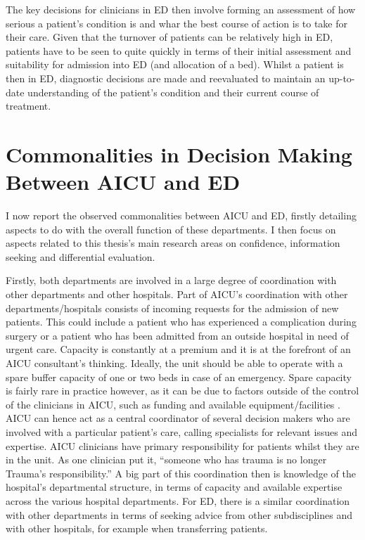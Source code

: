 \documentclass[a4paper, nobind]{templates/ociamthesis}
\begin{document}
\hfill\break
The key decisions for clinicians in ED then involve forming an assessment of how serious a patient's condition is and whar the best course of action is to take for their care. Given that the turnover of patients can be relatively high in ED, patients have to be seen to quite quickly in terms of their initial assessment and suitability for admission into ED (and allocation of a bed). Whilst a patient is then in ED, diagnostic decisions are made and reevaluated to maintain an up-to-date understanding of the patient's condition and their current course of treatment.

\section{Commonalities in Decision Making Between AICU and ED}\label{commonalities-in-decision-making-between-aicu-and-ed}

I now report the observed commonalities between AICU and ED, firstly detailing aspects to do with the overall function of these departments. I then focus on aspects related to this thesis's main research areas on confidence, information seeking and differential evaluation.

\hfill\break
Firstly, both departments are involved in a large degree of coordination with other departments and other hospitals. Part of AICU's coordination with other departments/hospitals consists of incoming requests for the admission of new patients. This could include a patient who has experienced a complication during surgery or a patient who has been admitted from an outside hospital in need of urgent care. Capacity is constantly at a premium and it is at the forefront of an AICU consultant's thinking. Ideally, the unit should be able to operate with a spare buffer capacity of one or two beds in case of an emergency. Spare capacity is fairly rare in practice however, as it can be due to factors outside of the control of the clinicians in AICU, such as funding and available equipment/facilities \autocite{gooch_icu_2014,murthy_intensive_2015}. AICU can hence act as a central coordinator of several decision makers who are involved with a particular patient's care, calling specialists for relevant issues and expertise. AICU clinicians have primary responsibility for patients whilst they are in the unit. As one clinician put it, ``someone who has trauma is no longer Trauma's responsibility.'' A big part of this coordination then is knowledge of the hospital's departmental structure, in terms of capacity and available expertise across the various hospital departments. For ED, there is a similar coordination with other departments in terms of seeking advice from other subdisciplines and with other hospitals, for example when transferring patients.
\end{document}
